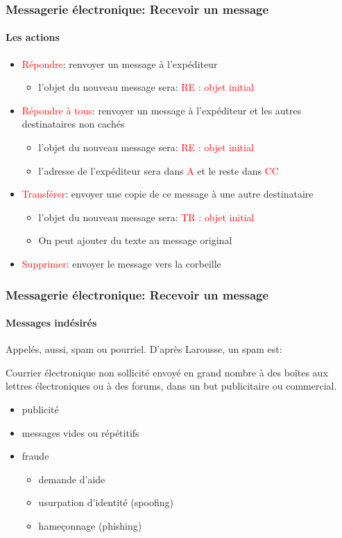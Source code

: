 \documentclass{beamer}
\begin{document}
\begin{frame}
\frametitle{Messagerie électronique: Recevoir un message}
\framesubtitle{Les actions}

\begin{itemize}
	\item \textcolor{red}{Répondre}: renvoyer un message à l'expéditeur
	\begin{itemize}
		\item l'objet du nouveau message sera: \textcolor{red}{RE : objet initial}
	\end{itemize}
	\item \textcolor{red}{Répondre à tous}: renvoyer un message à l'expéditeur et les autres destinataires non cachés
	\begin{itemize}
		\item l'objet du nouveau message sera: \textcolor{red}{RE : objet initial}
		\item l'adresse de l'expéditeur sera dans \textcolor{red}{A} et le reste dans \textcolor{red}{CC}
	\end{itemize}
	
	\item \textcolor{red}{Transférer}: envoyer une copie de ce message à une autre destinataire  
	\begin{itemize}
		\item l'objet du nouveau message sera: \textcolor{red}{TR : objet initial}
		\item On peut ajouter du texte au message original
	\end{itemize}
	
	\item \textcolor{red}{Supprimer}: envoyer le message vers la corbeille 
	
\end{itemize}


\end{frame}

\begin{frame}
\frametitle{Messagerie électronique: Recevoir un message}
\framesubtitle{Messages indésirés}

Appelés, aussi, spam ou pourriel. D'après Larousse, un spam est:
\begin{definition}
	Courrier électronique non sollicité envoyé en grand nombre à des boîtes aux lettres électroniques ou à des forums, dans un but publicitaire ou commercial.
\end{definition}

\begin{itemize}
	\item publicité
	\item messages vides ou répétitifs
	\item fraude
	\begin{itemize}
		\item demande d'aide
		\item usurpation d'identité (spoofing)
		\item hameçonnage (phishing)
	\end{itemize}
\end{itemize}


\end{frame}
\end{document}
